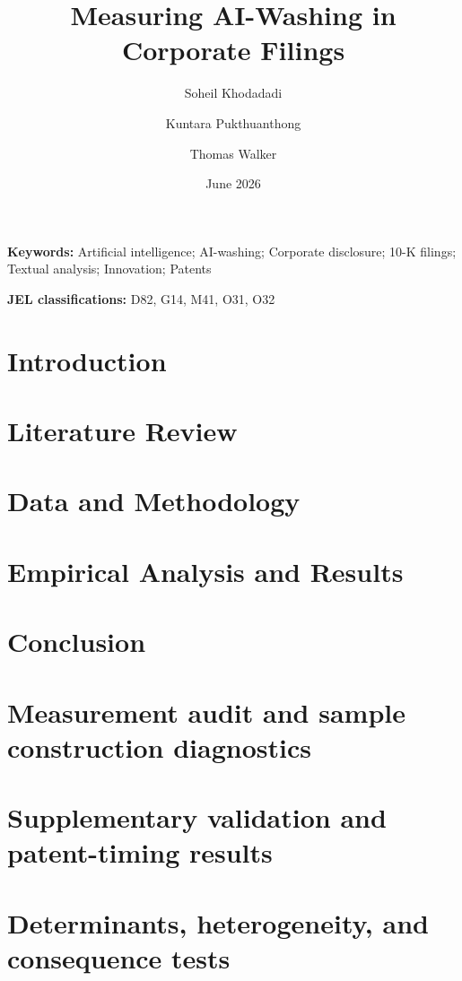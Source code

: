 \documentclass[11pt]{article}
\title{Measuring AI-Washing in Corporate Filings}
\author{Soheil Khodadadi \and Kuntara Pukthuanthong \and Thomas Walker}
\date{June 2026}
\begin{document}
\maketitle

\begin{abstract}

\end{abstract}

\noindent\textbf{Keywords:} Artificial intelligence; AI-washing; Corporate disclosure; 10-K filings; Textual analysis; Innovation; Patents

\noindent\textbf{JEL classifications:} D82, G14, M41, O31, O32

\section{Introduction}


\section{Literature Review}


\section{Data and Methodology}


\section{Empirical Analysis and Results}


\section{Conclusion}


\appendix

\renewcommand{\thesection}{Appendix \Alph{section}}
\renewcommand{\thetable}{\Alph{section}\arabic{table}}
\renewcommand{\thefigure}{\Alph{section}\arabic{figure}}

\clearpage
\section{Measurement audit and sample construction diagnostics}


\clearpage
\section{Supplementary validation and patent-timing results}


\clearpage
\section{Determinants, heterogeneity, and consequence tests}


\clearpage

\end{document}
